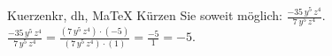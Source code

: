 \begin{MAufgabe}{Kuerzen}{kr, dh, MaTeX}
K\"urzen Sie soweit m\"oglich: $\frac{- 35\, y^5\, z^4}{7\, y^5\, z^4}$.\\ 
\ifLsg\MLoesung
\quad $\frac{- 35\, y^5\, z^4}{7\, y^5\, z^4}=\frac{(7\, y^5\, z^4)\cdot(-5)}{(7\, y^5\, z^4)\cdot(1)}=\frac{-5}{1}=-5$.\else\relax\fi
 \end{MAufgabe}
